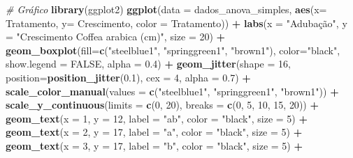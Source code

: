 \documentclass[
]{book}
\newenvironment{Shaded}{\begin{snugshade}}{\end{snugshade}}
\newcommand{\CommentTok}[1]{\textcolor[rgb]{0.56,0.35,0.01}{\textit{#1}}}
\newcommand{\DataTypeTok}[1]{\textcolor[rgb]{0.13,0.29,0.53}{#1}}
\newcommand{\DecValTok}[1]{\textcolor[rgb]{0.00,0.00,0.81}{#1}}
\newcommand{\FloatTok}[1]{\textcolor[rgb]{0.00,0.00,0.81}{#1}}
\newcommand{\KeywordTok}[1]{\textcolor[rgb]{0.13,0.29,0.53}{\textbf{#1}}}
\newcommand{\NormalTok}[1]{#1}
\newcommand{\OperatorTok}[1]{\textcolor[rgb]{0.81,0.36,0.00}{\textbf{#1}}}
\newcommand{\OtherTok}[1]{\textcolor[rgb]{0.56,0.35,0.01}{#1}}
\newcommand{\StringTok}[1]{\textcolor[rgb]{0.31,0.60,0.02}{#1}}
\begin{document}
\begin{Shaded}
\begin{Highlighting}[]
\CommentTok{# Gráfico}
\KeywordTok{library}\NormalTok{(ggplot2)}
\KeywordTok{ggplot}\NormalTok{(}\DataTypeTok{data =}\NormalTok{ dados_anova_simples, }\KeywordTok{aes}\NormalTok{(}\DataTypeTok{x=}\NormalTok{ Tratamento, }\DataTypeTok{y=}\NormalTok{ Crescimento, }\DataTypeTok{color =}\NormalTok{ Tratamento)) }\OperatorTok{+}\StringTok{ }
\StringTok{  }\KeywordTok{labs}\NormalTok{(}\DataTypeTok{x =} \StringTok{"Adubação"}\NormalTok{, }\DataTypeTok{y =} \StringTok{"Crescimento Coffea arabica (cm)"}\NormalTok{, }\DataTypeTok{size =} \DecValTok{20}\NormalTok{) }\OperatorTok{+}
\StringTok{  }\KeywordTok{geom_boxplot}\NormalTok{(}\DataTypeTok{fill=}\KeywordTok{c}\NormalTok{(}\StringTok{"steelblue1"}\NormalTok{, }\StringTok{"springgreen1"}\NormalTok{, }\StringTok{"brown1"}\NormalTok{), }\DataTypeTok{color=}\StringTok{"black"}\NormalTok{, }\DataTypeTok{show.legend =} \OtherTok{FALSE}\NormalTok{,}
               \DataTypeTok{alpha =} \FloatTok{0.4}\NormalTok{) }\OperatorTok{+}
\StringTok{  }\KeywordTok{geom_jitter}\NormalTok{(}\DataTypeTok{shape =} \DecValTok{16}\NormalTok{, }\DataTypeTok{position=}\KeywordTok{position_jitter}\NormalTok{(}\FloatTok{0.1}\NormalTok{), }\DataTypeTok{cex =} \DecValTok{4}\NormalTok{, }\DataTypeTok{alpha =} \FloatTok{0.7}\NormalTok{) }\OperatorTok{+}
\StringTok{  }\KeywordTok{scale_color_manual}\NormalTok{(}\DataTypeTok{values =} \KeywordTok{c}\NormalTok{(}\StringTok{"steelblue1"}\NormalTok{, }\StringTok{"springgreen1"}\NormalTok{, }\StringTok{"brown1"}\NormalTok{)) }\OperatorTok{+}
\StringTok{  }\KeywordTok{scale_y_continuous}\NormalTok{(}\DataTypeTok{limits =} \KeywordTok{c}\NormalTok{(}\DecValTok{0}\NormalTok{, }\DecValTok{20}\NormalTok{), }\DataTypeTok{breaks =} \KeywordTok{c}\NormalTok{(}\DecValTok{0}\NormalTok{, }\DecValTok{5}\NormalTok{, }\DecValTok{10}\NormalTok{, }\DecValTok{15}\NormalTok{, }\DecValTok{20}\NormalTok{)) }\OperatorTok{+}
\StringTok{  }\KeywordTok{geom_text}\NormalTok{(}\DataTypeTok{x =} \DecValTok{1}\NormalTok{, }\DataTypeTok{y =} \DecValTok{12}\NormalTok{, }\DataTypeTok{label =} \StringTok{"ab"}\NormalTok{, }\DataTypeTok{color =} \StringTok{"black"}\NormalTok{, }\DataTypeTok{size =} \DecValTok{5}\NormalTok{) }\OperatorTok{+}
\StringTok{  }\KeywordTok{geom_text}\NormalTok{(}\DataTypeTok{x =} \DecValTok{2}\NormalTok{, }\DataTypeTok{y =} \DecValTok{17}\NormalTok{, }\DataTypeTok{label =} \StringTok{"a"}\NormalTok{, }\DataTypeTok{color =} \StringTok{"black"}\NormalTok{, }\DataTypeTok{size =} \DecValTok{5}\NormalTok{) }\OperatorTok{+}
\StringTok{  }\KeywordTok{geom_text}\NormalTok{(}\DataTypeTok{x =} \DecValTok{3}\NormalTok{, }\DataTypeTok{y =} \DecValTok{17}\NormalTok{, }\DataTypeTok{label =} \StringTok{"b"}\NormalTok{, }\DataTypeTok{color =} \StringTok{"black"}\NormalTok{, }\DataTypeTok{size =} \DecValTok{5}\NormalTok{) }\OperatorTok{+}

\end{Highlighting}
\end{Shaded}
\end{document}
